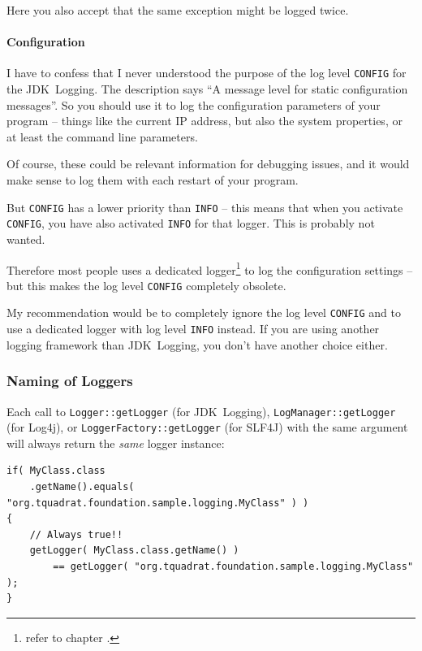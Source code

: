 Here you also accept that the same exception might be logged twice.

\paragraph{Configuration} I have to confess that I never understood the purpose of the log level \verb#CONFIG# for the JDK~Logging. The description says “A message level for static configuration messages”. So you should use it to log the configuration parameters of your program – things like the current IP address, but also the system properties, or at least the command line parameters.

Of course, these could be relevant information for debugging issues, and it would make sense to log them with each restart of your program.

But \verb#CONFIG# has a lower priority than \verb#INFO# – this means that when you activate \verb#CONFIG#, you have also activated \verb#INFO# for that logger. This is probably not wanted.

Therefore most people uses a dedicated logger\footnote{refer to chapter .} to log the configuration settings – but this makes the log level \verb#CONFIG# completely obsolete.

My recommendation would be to completely ignore the log level \verb#CONFIG# and to use a dedicated logger with log level \verb#INFO# instead. If you are using another logging framework than JDK~Logging, you don't have another choice either.


\subsubsection{Naming of Loggers}\label{sec:NamingOfLoggers}
Each call to \lstinline|Logger::getLogger| (for JDK~Logging), \lstinline|LogManager::getLogger| (for Log4j), or \lstinline|LoggerFactory::getLogger| (for SLF4J) with the same argument will always return the \textit{same} logger instance:
\begin{lstlisting}
if( MyClass.class
    .getName().equals( "org.tquadrat.foundation.sample.logging.MyClass" ) )
{
    // Always true!!
    getLogger( MyClass.class.getName() )
        == getLogger( "org.tquadrat.foundation.sample.logging.MyClass" );
}
\end{lstlisting}


